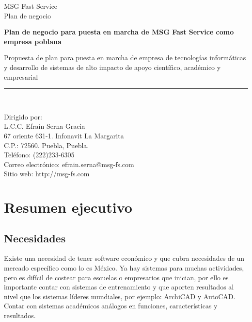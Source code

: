 \documentclass[12pt,spanish,lettersize]{article}
\author{Efrain Serna Gracia}
\begin{document}
\begin{center}
MSG Fast Service\\
\vspace*{0.15in}
Plan de negocio \\
\vspace*{0.6in}
\vspace*{0.2in}
\begin{Large}
\textbf{Plan de negocio para puesta en marcha de MSG Fast Service como empresa poblana} \\
\end{Large}
\vspace*{0.3in}
\begin{large}
Propuesta de plan para puesta en marcha de empresa de tecnolog\'ias inform\'aticas y desarrollo de sistemas de alto impacto de apoyo cient\'ifico, acad\'emico y empresarial\\
\end{large}
\vspace*{0.3in}
\rule{80mm}{0.1mm}\\
\vspace*{0.1in}
\begin{large}
Dirigido por: \\
L.C.C. Efra\'in Serna Gracia \\
\vspace*{0.3in}
67 oriente 631-1. Infonavit La Margarita\\
C.P.: 72560. Puebla, Puebla.\\
Tel\'efono: (222)233-6305\\
Correo electr\'onico: efrain.serna@msg-fs.com\\
Sitio web: http://msg-fs.com
\end{large}
\end{center}

\tableofcontents
\section{Resumen ejecutivo}
\subsection{Necesidades}
Existe una necesidad de tener software econ\'omico y que cubra necesidades de un mercado espec\'ifico como lo es M\'exico. Ya hay sistemas para muchas actividades, pero es dif\'icil de costear para escuelas o empresarios que inician, por ello es importante contar con sistemas de entrenamiento y que aporten resultados al nivel que los sistemas l\'ideres mundiales, por ejemplo: ArchiCAD y AutoCAD. Contar con sistemas acad\'emicos an\'alogos en funciones, caracter\'isticas y resultados.\\
\end{document}
